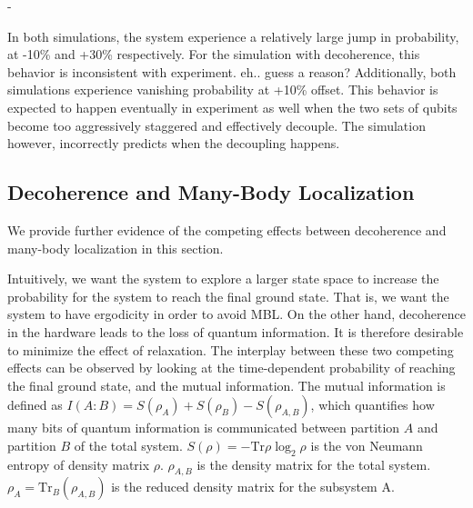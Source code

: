 -\documentclass[prd,twocolumn,tightenlines,preprintnumbers,showpacs,superscriptaddress,notitlepage,nofootinbib,eqsecnum,floatfix,longbibliography]{revtex4}
\begin{document}
In both simulations, the system experience a relatively large jump in probability, at -10\% and +30\% respectively.
For the simulation with decoherence, this behavior is inconsistent with experiment.
{\color{red} eh..
guess a reason?} Additionally, both simulations experience vanishing probability at +10\% offset.
This behavior is expected to happen eventually in experiment as well when the two sets of qubits become too aggressively staggered and effectively decouple.
The simulation however, incorrectly predicts when the decoupling happens.

\subsection{Decoherence and Many-Body Localization}

We provide further evidence of the competing effects between decoherence and many-body localization in this section.

Intuitively, we want the system to explore a larger state space to increase the probability for the system to reach the final ground state.
That is, we want the system to have ergodicity in order to avoid MBL.
On the other hand, decoherence in the hardware leads to the loss of quantum information.
It is therefore desirable to minimize the effect of relaxation.
The interplay between these two competing effects can be observed by looking at the time-dependent probability of reaching the final ground state, and the mutual information.
The mutual information is defined as $I(A:B)=S(\rho_A)+S(\rho_B)-S(\rho_{A,B})$, which quantifies how many bits of quantum information is communicated between partition $A$ and partition $B$ of the total system.
$S(\rho)=-\mbox{Tr}\rho \log_2 \rho$ is the von Neumann entropy of density matrix $\rho$.
{\color{blue} $\rho_{A,B}$ is the density matrix for the total system.
$\rho_{A}=\mbox{Tr}_{B} (\rho_{A,B})$ is the reduced density matrix for the subsystem A.}
\end{document}
